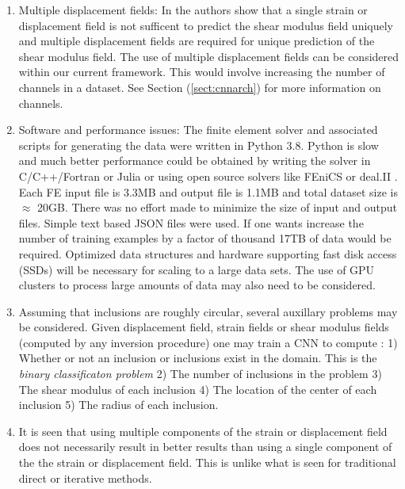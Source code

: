 \documentclass[12pt]{article}
\begin{document}
\begin{enumerate}
\item{Multiple displacement fields: In \cite{paper:barbonegokhale,paper:barbonebamber} the authors show that a single strain or displacement field is not sufficent to predict the shear modulus field uniquely and multiple displacement fields are required for unique prediction of the shear modulus field. The use of multiple displacement fields can be considered within our current framework. This would involve increasing the number of channels in a dataset. See Section (\ref{sect:cnnarch}) for more information on channels.} 
\item{Software and performance issues: The finite element solver and associated scripts for generating the data were written in Python 3.8. Python is slow and much better performance could be obtained by writing the solver in C/C++/Fortran or Julia or using open source solvers like FEniCS \cite{paper:fenics} or deal.II \cite{misc:deal.ii}. Each FE input file is 3.3MB and output file is 1.1MB and total dataset size is $\approx$  20GB. There was no effort made to minimize the size of input and output files. Simple text based JSON files were used. If one wants increase the number of training examples by a factor of thousand 17TB of data would be required. Optimized data structures and hardware supporting fast disk access (SSDs) will be necessary for scaling to a large data sets. The use of GPU clusters to process large amounts of data may also need to be considered. }
\item{Assuming that inclusions are roughly circular, several auxillary problems may be considered. Given displacement field, strain fields or shear modulus fields (computed by any inversion procedure) one may train a CNN to compute : 1) Whether or not an inclusion or inclusions exist  in the domain. This is the \textit{binary classificaton problem} 2) The number of inclusions in the problem 3) The shear modulus of each inclusion 4) The location of the center of each inclusion 5) The radius of each inclusion. }
\item{It is seen that using multiple components of the strain or displacement field does not necessarily result in better results than using a single component of the the strain or displacement field. This is unlike what is seen for traditional direct or iterative methods.}
\end{enumerate}
\clearpage
{}

\end{document}

